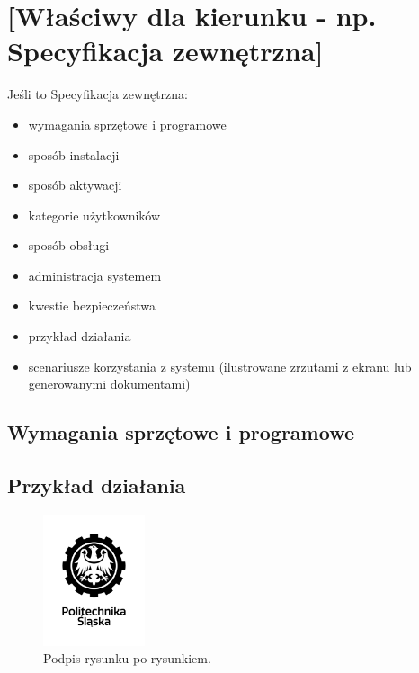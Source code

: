 

\chapter{[Właściwy dla kierunku - np. Specyfikacja zewnętrzna]}
Jeśli to Specyfikacja zewnętrzna:
\begin{itemize}
\item  wymagania sprzętowe i programowe
\item  sposób instalacji
\item  sposób aktywacji
\item  kategorie użytkowników
\item  sposób obsługi
\item   administracja systemem
\item  kwestie bezpieczeństwa
\item  przykład działania
\item  scenariusze korzystania z systemu (ilustrowane zrzutami z ekranu lub generowanymi dokumentami)
\end{itemize}

\section{Wymagania sprzętowe i programowe}

\section{Przykład działania}

\begin{figure}
\centering
\includegraphics[width=3cm]{logo_pl.jpg}
\caption{Podpis rysunku po rysunkiem.}
\label{fig:2}
\end{figure}